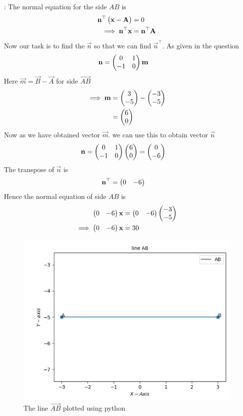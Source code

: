 \solution:
       The normal equation for the side $AB$ is
\begin{align}
\mathbf{n}^{\top}\begin{pmatrix}\mathbf{x}-\mathbf{A}\end{pmatrix}&=0\\
\implies
\mathbf{n}^{\top}\mathbf{x}&=\mathbf{n}^{\top}\mathbf{A}
\end{align}
Now our task is to find the $\vec{n}$ so that we can find $\vec{n}^{\top}$.
As given in the question 
\begin{align}
  \mathbf{n} &= \begin{pmatrix}0 & 1\\
  -1 & 0\end{pmatrix}\mathbf{m}
\end{align}
Here $\vec{m} = \vec{B}- \vec{A}$ for side $\vec{AB}$
\begin{align}
\implies
\mathbf{m}&=\begin{pmatrix}3\\-5\end{pmatrix} - \begin{pmatrix}-3\\-5\end{pmatrix}\\
&=\begin{pmatrix}6\\0\end{pmatrix}
\end{align}
Now as we have obtained vector $\vec{m}$.
we can use this to obtain vector $\vec{n}$
\begin{align}
\mathbf{n} &= \begin{pmatrix}0 & 1\\
  -1 & 0\end{pmatrix}\begin{pmatrix}6\\0\end{pmatrix}
 = \begin{pmatrix}0\\-6\end{pmatrix}
\end{align}
The transpose of $\vec{n}$ is
\begin{align}
  \mathbf{n}^{\top}&=\begin{pmatrix}0 & -6\end{pmatrix}
\end{align}
Hence the normal equation of side $AB$ is 
\begin{align}
    \begin{pmatrix}0 & -6\end{pmatrix}\mathbf{x}&=\begin{pmatrix}0 & -6\end{pmatrix}\begin{pmatrix}-3\\-5\end{pmatrix}\\
    \implies
    \begin{pmatrix}0 & -6\end{pmatrix}\mathbf{x}&=30
\end{align}
\begin{figure}
\includegraphics [width=\columnwidth] {figs/lineab.png}
\caption{ The line $\vec{AB}$ plotted using python}
\label{fig: lineab}
\end{figure}


